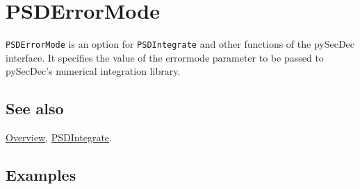\documentclass[../FeynHelpersManual.tex]{subfiles}
\begin{document}
\hypertarget{psderrormode}{
\section{PSDErrorMode}\label{psderrormode}}

\texttt{PSDErrorMode} is an option for \texttt{PSDIntegrate} and other
functions of the pySecDec interface. It specifies the value of the
errormode parameter to be passed to pySecDec's numerical integration
library.

\subsection{See also}

\hyperlink{toc}{Overview}, \hyperlink{psdintegrate}{PSDIntegrate}.

\subsection{Examples}
\end{document}
